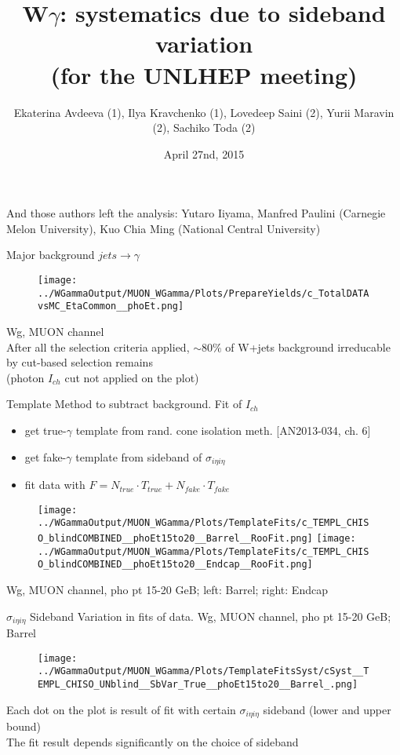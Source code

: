 \documentclass{beamer}
\title{W$\gamma$: systematics due to sideband variation \\ (for the UNLHEP meeting)}
\author{Ekaterina Avdeeva (1), Ilya Kravchenko (1), Lovedeep Saini (2), Yurii Maravin (2), Sachiko Toda (2)}
\institute{(1)University of Nebraska - Lincoln, (2)Kansas State University}
\date{April 27nd, 2015}
\begin{document}
\begin{frame}
\titlepage
\scriptsize
And those authors left the analysis:
Yutaro Iiyama, Manfred Paulini (Carnegie Melon University), Kuo Chia Ming (National Central University)
\end{frame}

\begin{frame}{Major background $jets \rightarrow \gamma$}\\
  \begin{figure}
  \texttt{[image: ../WGammaOutput/MUON\_WGamma/Plots/PrepareYields/c\_TotalDATAvsMC\_EtaCommon\_\_phoEt.png]}\\
  \end{figure}
  \scriptsize
  Wg, MUON channel\\
  After all the selection criteria applied, $\sim 80\%$ of W+jets background irreducable by cut-based selection remains\\
  (photon $I_{ch}$ cut not applied on the plot)
\end{frame}

\begin{frame}{Template Method to subtract background. Fit of $I_{ch}$}\\
  \scriptsize
  \begin{itemize}
  \item get true-$\gamma$ template from rand. cone isolation meth. [AN2013-034, ch. 6]
  \item get fake-$\gamma$ template from sideband of $\sigma_{i\eta{i}\eta}$
  \item fit data with $F=N_{true} \cdot T_{true} + N_{fake} \cdot T_{fake}$
  \end{itemize}
  \begin{figure}
  \texttt{[image: ../WGammaOutput/MUON\_WGamma/Plots/TemplateFits/c\_TEMPL\_CHISO\_blindCOMBINED\_\_phoEt15to20\_\_Barrel\_\_RooFit.png]}  \texttt{[image: ../WGammaOutput/MUON\_WGamma/Plots/TemplateFits/c\_TEMPL\_CHISO\_blindCOMBINED\_\_phoEt15to20\_\_Endcap\_\_RooFit.png]}\\
  \end{figure}
  \scriptsize
  Wg, MUON channel, pho pt 15-20 GeB; left: Barrel; right: Endcap\\ 
\end{frame}

\begin{frame}{$\sigma_{i\eta{i}\eta}$ Sideband Variation in fits of data. Wg, MUON channel, pho pt 15-20 GeB; Barrel}\\
  \begin{figure}
     \texttt{[image: ../WGammaOutput/MUON\_WGamma/Plots/TemplateFitsSyst/cSyst\_\_TEMPL\_CHISO\_UNblind\_\_SbVar\_True\_\_phoEt15to20\_\_Barrel\_.png]}\\
  \end{figure}
  \scriptsize
  Each dot on the plot is result of fit with certain $\sigma_{i\eta{i}\eta}$ sideband (lower and upper bound)\\
  The fit result depends significantly on the choice of sideband 
\end{frame}
\end{document}
